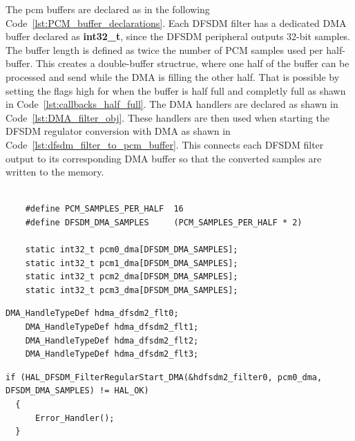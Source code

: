     The pcm buffers are declared as in the following Code~\ref{lst:PCM_buffer_declarations}. Each DFSDM filter has a dedicated DMA buffer declared as \textbf{int32\_t}, since the DFSDM peripheral outputs 32-bit samples. The buffer length is defined as twice the number of PCM samples used per half-buffer. This creates a double-buffer structrue, where one half of the buffer can be processed and send while the DMA is filling the other half. That is possible by setting the flags high for when the buffer is half full and completly full as shawn in Code~\ref{lst:callbacks_half_full}.
    The DMA handlers are declared as shawn in Code~\ref{lst:DMA_filter_obj}. These handlers are then used when starting the DFSDM regulator conversion with DMA as shawn in Code~\ref{lst:dfsdm_filter_to_pcm_buffer}. This connects each DFSDM filter output to its corresponding DMA buffer so that the converted samples are written to the memory. 
    
    \begin{lstlisting}[style=cstyle, caption={PCM buffers declaration}, label={lst:PCM_buffer_declarations}]
    
    #define PCM_SAMPLES_PER_HALF  16
    #define DFSDM_DMA_SAMPLES     (PCM_SAMPLES_PER_HALF * 2)
    
    static int32_t pcm0_dma[DFSDM_DMA_SAMPLES];
    static int32_t pcm1_dma[DFSDM_DMA_SAMPLES];
    static int32_t pcm2_dma[DFSDM_DMA_SAMPLES];
    static int32_t pcm3_dma[DFSDM_DMA_SAMPLES];
    \end{lstlisting}

    \begin{lstlisting}[style=cstyle, caption={Declaration of the DMA objects}, label={lst:DMA_filter_obj}]
    DMA_HandleTypeDef hdma_dfsdm2_flt0;
    DMA_HandleTypeDef hdma_dfsdm2_flt1;
    DMA_HandleTypeDef hdma_dfsdm2_flt2;
    DMA_HandleTypeDef hdma_dfsdm2_flt3;
    \end{lstlisting}
\newpage    
    \begin{lstlisting}[style=cstyle, caption={Connecting a DFSDM filter output to its dedicated DMA buffer}, label={lst:dfsdm_filter_to_pcm_buffer}]
     if (HAL_DFSDM_FilterRegularStart_DMA(&hdfsdm2_filter0, pcm0_dma, DFSDM_DMA_SAMPLES) != HAL_OK)
  {
      Error_Handler();
  }
  \end{lstlisting}

